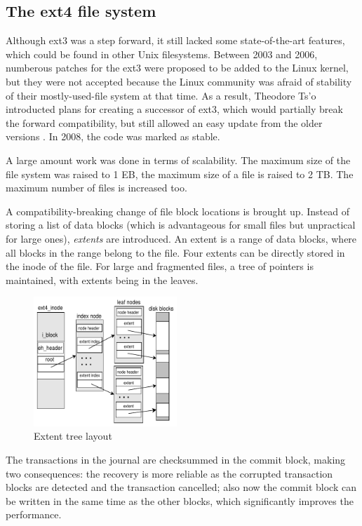 \documentclass{acm_proc_article-sp}
\begin{document}
\subsection{The ext4 file system}

Although ext3 was a step forward, it still lacked some state-of-the-art features, which could be found in other Unix filesystems. Between 2003 and 2006, numberous patches for the ext3 were proposed to be added to the Linux kernel, but they were not accepted because the Linux community was afraid of stability of their mostly-used-file system at that time. As a result, Theodore Ts'o introducted plans for creating a successor of ext3, which would partially break the forward compatibility, but still allowed an easy update from the older versions \cite{newext4}. In 2008, the code was marked as stable.

A large amount work was done in terms of scalability. The maximum size of the file system was raised to 1 EB, the maximum size of a file is raised to 2 TB. The maximum number of files is increased too.

A compatibility-breaking change of file block locations is brought up. Instead of storing a list of data blocks (which is advantageous for small files but unpractical for large ones), {\it extents} are introduced. An extent is a range of data blocks, where all blocks in the range belong to the file. Four extents can be directly stored in the inode of the file. For large and fragmented files, a tree of pointers is maintained, with extents being in the leaves.

\begin{figure}
\centering
\includegraphics[width=0.48\textwidth]{images/extents.pdf}
	\caption{Extent tree layout \cite{newext4}}
\end{figure}

The transactions in the journal are checksummed in the commit block, making two consequences: the recovery is more reliable as the corrupted transaction blocks are detected and the transaction cancelled; also now the commit block can be written in the same time as the other blocks, which significantly improves the performance.
\end{document}
